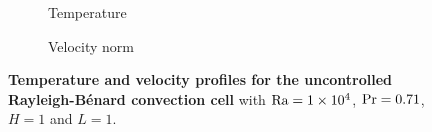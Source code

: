 \begin{figure}
\centering
\begin{subfigure}[t]{.33\textwidth}
	\centering
	\caption{Temperature}
\end{subfigure} \qquad
\begin{subfigure}[t]{.33\textwidth}
	\centering
	\caption{Velocity norm}
\end{subfigure}
\caption{\textbf{Temperature and velocity profiles for the uncontrolled Rayleigh-B\'enard convection cell} with $\text{Ra}=\num{1e4}$, $\text{Pr}=0.71$, $H=1$ and $L=1$.}
\label{fig:rayleigh_convection}
\end{figure}
